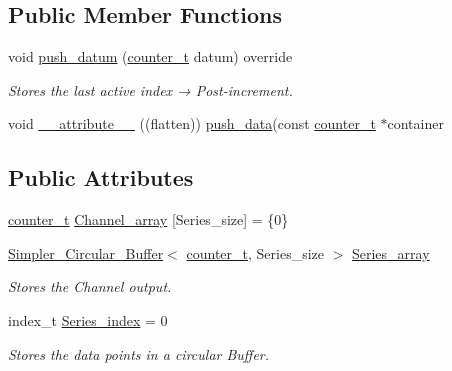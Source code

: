 \subsection*{Public Member Functions}
\begin{DoxyCompactItemize}
\item 
void \hyperlink{classLin__ACorr__RT__Teensy_a0172fa99b6318008a5e623fa9b2ccdcb}{push\+\_\+datum} (\hyperlink{types_8hpp_a22f279793847eba127de149437848c48}{counter\+\_\+t} datum) override
\begin{DoxyCompactList}\small\item\em Stores the last active index → Post-\/increment. \end{DoxyCompactList}\item 
void \hyperlink{classLin__ACorr__RT__Teensy_a0bfee7278e28c759cca2497749aeecf7}{\+\_\+\+\_\+attribute\+\_\+\+\_\+} ((flatten)) \hyperlink{classLin__ACorr__RT__Base_a91c95a49619995f40aeae80916afed3e}{push\+\_\+data}(const \hyperlink{types_8hpp_a22f279793847eba127de149437848c48}{counter\+\_\+t} $\ast$container
\end{DoxyCompactItemize}
\subsection*{Public Attributes}
\begin{DoxyCompactItemize}
\item 
\hyperlink{types_8hpp_a22f279793847eba127de149437848c48}{counter\+\_\+t} \hyperlink{classLin__ACorr__RT__Teensy_af4dda93e07198bae54553a8f11773e74}{Channel\+\_\+array} \mbox{[}Series\+\_\+size\mbox{]} = \{0\}
\item 
\hyperlink{classSimpler__Circular__Buffer}{Simpler\+\_\+\+Circular\+\_\+\+Buffer}$<$ \hyperlink{types_8hpp_a22f279793847eba127de149437848c48}{counter\+\_\+t}, Series\+\_\+size $>$ \hyperlink{classLin__ACorr__RT__Teensy_a9a619d1a74076f0bac8b7f03acebbb75}{Series\+\_\+array}
\begin{DoxyCompactList}\small\item\em Stores the Channel output. \end{DoxyCompactList}\item 
index\+\_\+t \hyperlink{classLin__ACorr__RT__Teensy_a495539383a4cab5ff611545361600599}{Series\+\_\+index} = 0
\begin{DoxyCompactList}\small\item\em Stores the data points in a circular Buffer. \end{DoxyCompactList}\end{DoxyCompactItemize}


